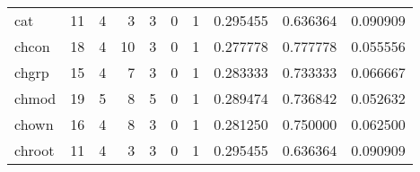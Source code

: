 \begin{longtable}{lrrrrrrrrr}
cat       &                                      11 &                                                  4 &                                                  3 &                                                  3 &                                                  0 &                                                  1 &                                           0.295455 &                               0.636364 &                             0.090909 \\
chcon     &                                      18 &                                                  4 &                                                 10 &                                                  3 &                                                  0 &                                                  1 &                                           0.277778 &                               0.777778 &                             0.055556 \\
chgrp     &                                      15 &                                                  4 &                                                  7 &                                                  3 &                                                  0 &                                                  1 &                                           0.283333 &                               0.733333 &                             0.066667 \\
chmod     &                                      19 &                                                  5 &                                                  8 &                                                  5 &                                                  0 &                                                  1 &                                           0.289474 &                               0.736842 &                             0.052632 \\
chown     &                                      16 &                                                  4 &                                                  8 &                                                  3 &                                                  0 &                                                  1 &                                           0.281250 &                               0.750000 &                             0.062500 \\
chroot    &                                      11 &                                                  4 &                                                  3 &                                                  3 &                                                  0 &                                                  1 &                                           0.295455 &                               0.636364 &                             0.090909 \\

\end{longtable}
